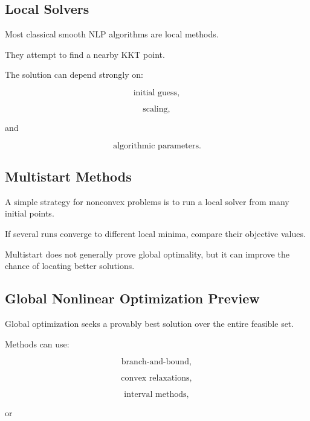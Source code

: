 \subsection{Local Solvers}
\label{subsec:nlp-local-solvers}

Most classical smooth NLP algorithms are local methods.

They attempt to find a nearby KKT point.

The solution can depend strongly on:

\[
\boxed{
\text{initial guess},
}
\]

\[
\boxed{
\text{scaling},
}
\]

and

\[
\boxed{
\text{algorithmic parameters}.
}
\]

\subsection{Multistart Methods}
\label{subsec:nlp-multistart}

A simple strategy for nonconvex problems is to run a local solver from
many initial points.

If several runs converge to different local minima, compare their
objective values.

Multistart does not generally prove global optimality, but it can improve
the chance of locating better solutions.

\subsection{Global Nonlinear Optimization Preview}
\label{subsec:global-nonlinear-optimization-preview}

Global optimization seeks a provably best solution over the entire
feasible set.

Methods can use:

\[
\boxed{
\text{branch-and-bound},
}
\]

\[
\boxed{
\text{convex relaxations},
}
\]

\[
\boxed{
\text{interval methods},
}
\]

or

